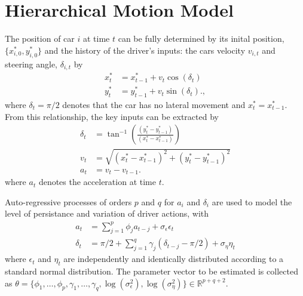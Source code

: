 \documentclass[12pt,a4paper]{article}\usepackage[]{graphicx}\usepackage[]{color}
\begin{document}
\section{Hierarchical Motion Model}

The position of car $i$ at time $t$ can be fully determined by its inital position, $\{x^*_{i, 0}, y^*_{i, 0}\}$ and the history of the driver's inputs: the cars velocity $v_{i, t}$ and steering angle, $\delta_{i, t}$ by
\begin{align}
x^*_{t} &= x^*_{t-1} + v_{t} \cos(\delta_{t}) \label{xEq} \\
y^*_{t} &= y^*_{t-1} + v_{t} \sin(\delta_{t}). \label{yEq},
\end{align}
where $\delta_{t} = \pi/2$ denotes that the car has no lateral movement and $x^*_{t} = x^*_{t-1}$.
From this relationship, the key inputs can be extracted by
\begin{align}
\delta_{t} &= \tan^{-1}\left(\frac{(y^*_{t} - y^*_{t-1})}{(x^*_{t} - x^*_{t-1})} \right) \label{dEq} \\
v_{t} &= \sqrt{(x^*_{t} - x^*_{t-1})^2 + (y^*_{t} - y^*_{t-1})^2} \label{vEq} \\
a_{t} &= v_{t} - v_{t-1}. \label{aEq}
\end{align}
where $a_{t}$ denotes the acceleration at time $t$.

Auto-regressive processes of orders $p$ and $q$ for $a_i$ and  $\delta_i$ are used to model the level of persistance and variation of driver actions, with
\begin{align}
a_{t} &= \sum_{j = 1}^p \phi_{j} a_{t-j} + \sigma_{\epsilon} \epsilon_{t} \label{aAR} \\
\delta_{t} &= \pi/2 + \sum_{j = 1}^q \gamma_{j} (\delta_{t-j} - \pi/2) + \sigma_{\eta} \eta_{t} \label{dAR}
\end{align}
where $\epsilon_{t}$ and $\eta_t$ are independently and identically distributed according to a standard normal distribution. The parameter vector to be estimated is collected as $\theta = \{\phi_{1}, \dots, \phi_{p}, \gamma_{1}, \dots, \gamma_{q}, \log(\sigma^{2}_{\epsilon}), \log(\sigma^{2}_{\eta})\} \in \mathbb{R}^{p + q + 2}$.
\end{document}
